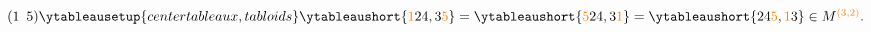 \documentclass[crop,equation,convert={outext=.svg,command=\unexpanded{pdf2svg \infile\space\outfile}},multi=false]{standalone}
\begin{document}
\color{white}\Huge\boldmath
$(1\enspace 5)\ytableausetup{centertableaux,tabloids} \ytableaushort{{\color{orange}1}24,3{\color{orange}5}} = \ytableaushort{{\color{orange}5}24,3{\color{orange}1}} = \ytableaushort{24{\color{orange}5},{\color{orange}1}3}\in M^{\color{orange}{(3,2)}}.$
\end{document}

